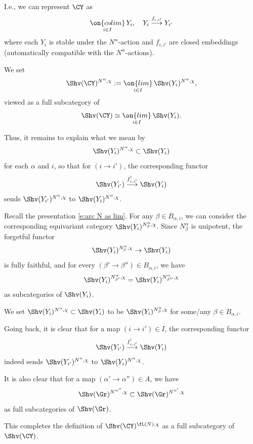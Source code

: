 \documentclass[9pt]{amsart}
\theoremstyle{definition}
\theoremstyle{remark}
\numberwithin{equation}{section}
\begin{document}
\medskip

I.e., we can represent $\CY$ as 
\begin{equation}  \label{e:indsch as colim}
\underset{i\in I}{\on{colim}}\, Y_i,\quad Y_i\overset{f_{i,i'}}\longrightarrow Y_{i'}
\end{equation}
where each $Y_i$ is stable under the $N^\alpha$-action and $f_{i,i'}$ are closed embeddings
(automatically compatible with the $N^\alpha$-actions). 

\medskip

We set
$$\Shv(\CY)^{N^\alpha,\chi}:=\underset{i\in I}{\on{lim}}\, \Shv(Y_i)^{N^\alpha,\chi},$$
viewed as a full subcategory of 
$$\Shv(\CY)\simeq \underset{i\in I}{\on{lim}}\, \Shv(Y_i).$$

Thus, it remains to explain what we mean by
$$\Shv(Y_i)^{N^\alpha,\chi}\subset \Shv(Y_i)$$
for each $\alpha$ and $i$, so that for $(i\to i')$, the corresponding functor 
$$\Shv(Y_{i'}) \overset{f_{i,i'}^!}\longrightarrow \Shv(Y_i)$$
sends $\Shv(Y_{i'})^{N^\alpha,\chi}$ to $\Shv(Y_i)^{N^\alpha,\chi}$.

\sssec{}

Recall the presentation \eqref{e:arc N as lim}. 
For any $\beta\in B_{\alpha,i}$, we can consider the corresponding equivariant category
$\Shv(Y_i)^{N^\alpha_\beta,\chi}$. Since $N^\alpha_\beta$ is unipotent, the forgetful functor
$$\Shv(Y_i)^{N^\alpha_\beta,\chi}\to \Shv(Y_i)$$ is fully faithful, and  
for every $(\beta'\to \beta'')\in B_{\alpha,i}$, we have
$$\Shv(Y_i)^{N^\alpha_{\beta'},\chi}=\Shv(Y_i)^{N^\alpha_{\beta''},\chi}$$
as subcategories of $\Shv(Y_i)$. 

\medskip

We set $\Shv(Y_i)^{N^\alpha,\chi}\subset \Shv(Y_i)$ to be $\Shv(Y_i)^{N^\alpha_\beta,\chi}$ 
for some/any $\beta\in B_{\alpha,i}$. 

\sssec{}

Going back, it is clear that for a map $(i\to i')\in I$, the corresponding functor
$$\Shv(Y_{i'}) \overset{f_{i,i'}^!}\longrightarrow \Shv(Y_i)$$
indeed sends $\Shv(Y_{i'})^{N^\alpha,\chi}$ to $\Shv(Y_i)^{N^\alpha,\chi}$.

\medskip

It is also clear that for a map $(\alpha'\to \alpha'')\in A$, we have
$$\Shv(\Gr)^{N^{\alpha''},\chi}\subset \Shv(\Gr)^{N^{\alpha'},\chi}$$
as full subcategories of $\Shv(\Gr)$. 

\medskip

This completes the definition of $\Shv(\CY)^{\fL(N),\chi}$ as a full subcategory of $\Shv(\CY)$. 
\end{document}
